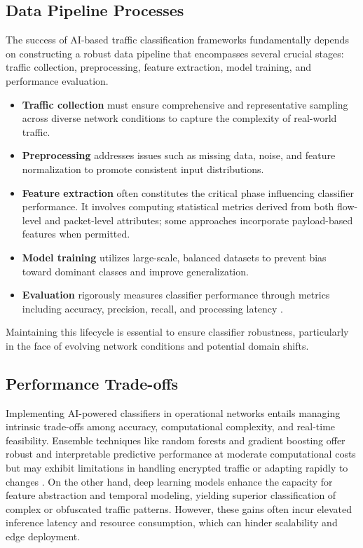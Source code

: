 \subsection{Data Pipeline Processes}

The success of AI-based traffic classification frameworks fundamentally depends on constructing a robust data pipeline that encompasses several crucial stages: traffic collection, preprocessing, feature extraction, model training, and performance evaluation.

\begin{itemize}
\item \textbf{Traffic collection} must ensure comprehensive and representative sampling across diverse network conditions to capture the complexity of real-world traffic.

\item \textbf{Preprocessing} addresses issues such as missing data, noise, and feature normalization to promote consistent input distributions.

\item \textbf{Feature extraction} often constitutes the critical phase influencing classifier performance. It involves computing statistical metrics derived from both flow-level and packet-level attributes; some approaches incorporate payload-based features when permitted.

\item \textbf{Model training} utilizes large-scale, balanced datasets to prevent bias toward dominant classes and improve generalization.

\item \textbf{Evaluation} rigorously measures classifier performance through metrics including accuracy, precision, recall, and processing latency \cite{ref51}.
\end{itemize}

Maintaining this lifecycle is essential to ensure classifier robustness, particularly in the face of evolving network conditions and potential domain shifts.

\subsection{Performance Trade-offs}

Implementing AI-powered classifiers in operational networks entails managing intrinsic trade-offs among accuracy, computational complexity, and real-time feasibility. Ensemble techniques like random forests and gradient boosting offer robust and interpretable predictive performance at moderate computational costs but may exhibit limitations in handling encrypted traffic or adapting rapidly to changes \cite{ref51}. On the other hand, deep learning models enhance the capacity for feature abstraction and temporal modeling, yielding superior classification of complex or obfuscated traffic patterns. However, these gains often incur elevated inference latency and resource consumption, which can hinder scalability and edge deployment.

